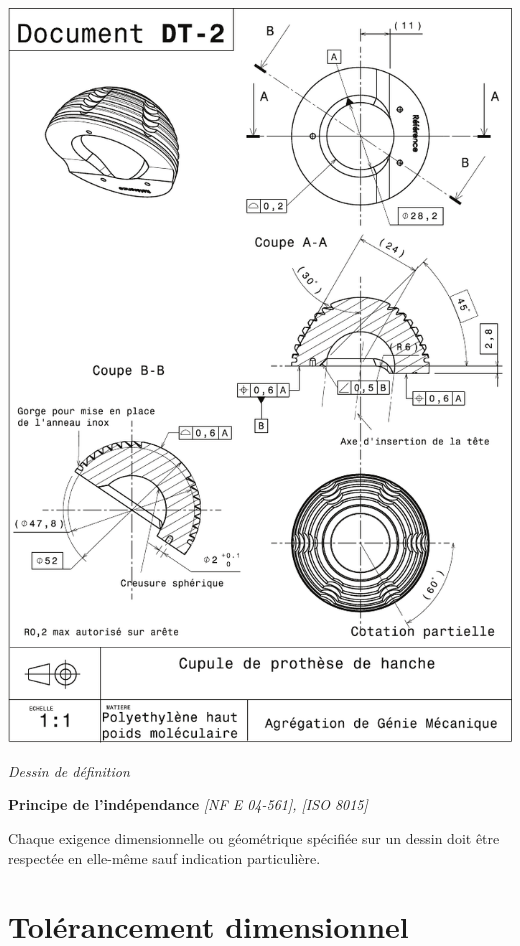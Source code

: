 \documentclass[11pt,oneside]{article}
\begin{document}
\begin{minipage}[c]{.46\linewidth}
\begin{center}
\includegraphics[width=.95\textwidth]{png/dessin_def}

\textit{Dessin de définition}
\end{center}
\end{minipage}

\begin{resultat}
\textbf{Principe de l'indépendance} \textit{[NF E 04-561], [ISO 8015]}

Chaque exigence dimensionnelle ou géométrique spécifiée sur un dessin doit être respectée en elle-même sauf indication particulière.

\end{resultat}



\section{Tolérancement dimensionnel}
\end{document}
